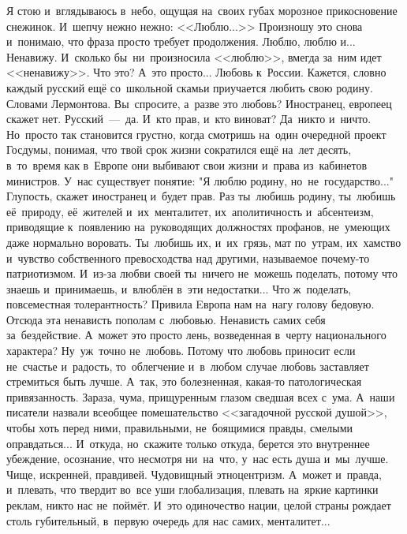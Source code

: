 \lettrine[lines=3, loversize=0.1]{Я}{} стою и~вглядываюсь в~небо, ощущая на~своих губах морозное прикосновение снежинок.
И~шепчу нежно нежно: <<Люблю...>>
Произношу это снова и~понимаю, что фраза просто требует продолжения.
Люблю, люблю и...
Ненавижу.
И~сколько бы~ни~произносила <<люблю>>, вмегда за~ним идет <<ненавижу>>.
Что это? А~это просто...
Любовь к~России.
Кажется, словно каждый русский ещё со~школьной скамьи приучается любить свою родину.
Словами Лермонтова.
Вы~спросите, а~разве это любовь? Иностранец, европеец скажет нет.
Русский~---~да.
И~кто прав, и~кто виноват? Да~никто и~ничто.
Но~просто так становится грустно, когда смотришь на~один очередной проект Госдумы, понимая, что твой срок жизни сократился ещё на~лет десять, в~то~время как в~Европе они выбивают свои жизни и~права из~кабинетов министров.
У~нас существует понятие: "Я люблю родину, но~не~государство..." Глупость, скажет иностранец и~будет прав.
Раз ты~любишь родину, ты~любишь её~природу, её~жителей и~их~менталитет, их~аполитичность и~абсентеизм, приводящие к~появлению на~руководящих должностях профанов, не~умеющих даже нормально воровать.
Ты~любишь их, и~их~грязь, мат по~утрам, их~хамство и~чувство собственного превосходства над другими, называемое почему-то патриотизмом.
И~из-за любви своей ты~ничего не~можешь поделать, потому что знаешь и~принимаешь, и~влюблён в~эти недостатки...
Что ж~поделать, повсеместная толерантность? Привила Eвропа нам на~нагу голову бедовую.
Отсюда эта ненависть пополам с~любовью.
Ненависть самих себя за~бездействие.
А~может это просто лень, возведенная в~черту национального характера? Ну~уж~точно не~любовь.
Потому что любовь приносит если не~счастье и~радость, то~облегчение и~в~любом случае любовь заставляет стремиться быть лучше.
А~так, это болезненная, какая-то патологическая привязанность.
Зараза, чума, прищуренным глазом сведшая всех с~ума.
А~наши писатели назвали всеобщее помешательство <<загадочной русской душой>>, чтобы хоть перед ними, правильными, не~боящимися правды, смелыми оправдаться...
И~откуда, но~скажите только откуда, берется это внутреннее убеждение, осознание, что несмотря ни~на~что, у~нас есть душа и~мы~лучше.
Чище, искренней, правдивей.
Чудовищный этноцентризм.
А~может и~правда, и~плевать, что твердит во~все уши глобализация, плевать на~яркие картинки реклам, никто нас не~поймёт.
И~это одиночество нации, целой страны рождает столь губительный, в~первую очередь для нас самих, менталитет...

